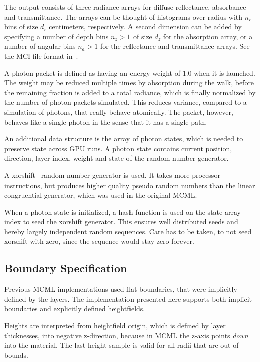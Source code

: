 \documentclass[]{article}
\begin{document}
The output consists of three radiance arrays for diffuse reflectance, absorbance and transmittance. The arrays can be thought of histograms over radius with $n_r$ bins of size $d_r$ centimeters, respectively. A second dimension can be added by specifying a number of depth bins $n_z > 1$ of size $d_z$ for the absorption array, or a number of angular bins $n_a > 1$ for the reflectance and transmittance arrays. See the MCI file format in~\cite{wang1992monte}.

A photon packet is defined as having an energy weight of $1.0$ when it is launched. The weight may be reduced multiple times by absorption during the walk, before the remaining fraction is added to a total radiance, which is finally normalized by the number of photon packets simulated. This reduces variance, compared to a simulation of photons, that really behave atomically. The packet, however, behaves like a single photon in the sense that it has a single path.

An additional data structure is the array of photon states, which is needed to preserve state across GPU runs. A photon state contains current position, direction, layer index, weight and state of the random number generator.

A xorshift~\cite{marsaglia2003xorshift} random number generator is used. It takes more processor instructions, but produces higher quality pseudo random numbers than the linear congruential generator, which was used in the original MCML.

When a photon state is initialized, a hash function is used on the state array index to seed the xorshift generator. This ensures well distributed seeds and hereby largely independent random sequences. Care has to be taken, to not seed xorshift with zero, since the sequence would stay zero forever.

\subsection{Boundary Specification}

Previous MCML implementations used flat boundaries, that were implicitly defined by the layers. The implementation presented here supports both implicit boundaries and explicitly defined heightfields.

Heights are interpreted from heightfield origin, which is defined by layer thicknesses, into negative z-direction, because in MCML the z-axis points \emph{down} into the material. The last height sample is valid for all radii that are out of bounds.
\end{document}

